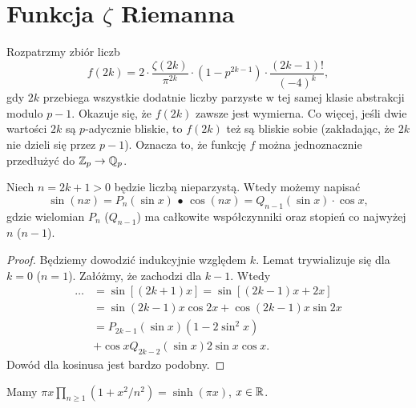 \section{Funkcja $\zeta$ Riemanna}
Rozpatrzmy zbiór liczb
\[
	f(2k) = 2 \cdot \frac{\zeta(2k)}{\pi^{2k}} \cdot (1-p^{2k-1}) \cdot \frac{(2k-1)!}{(-4)^k},
\]
gdy $2k$ przebiega wszystkie dodatnie liczby parzyste w tej samej klasie abstrakcji modulo $p-1$.
Okazuje się, że $f(2k)$  zawsze jest wymierna.
Co więcej, jeśli dwie wartości $2k$ są $p$-adycznie bliskie, to $f(2k)$ też są bliskie sobie (zakładając, że $2k$ nie dzieli się przez $p-1$).
Oznacza to, że funkcję $f$ można jednoznacznie przedłużyć do $\mathbb Z_p \to \mathbb Q_p$.

\begin{lemat}
	Niech $n = 2k+1 > 0$ będzie liczbą nieparzystą.
	Wtedy możemy napisać
	\[
		\sin (nx) = P_n(\sin x) \,\bullet\,
		\cos (nx) = Q_{n-1} (\sin x) \cdot \cos x,
	\]
	gdzie wielomian $P_n$ ($Q_{n-1}$) ma całkowite współczynniki oraz stopień co najwyżej $n$ ($n-1$).
\end{lemat}

\begin{proof}
	Będziemy dowodzić indukcyjnie względem $k$.
	Lemat trywializuje się dla $k = 0$ ($n = 1$).
	Załóżmy, że zachodzi dla $k - 1$.
	Wtedy
	\begin{align*}
	\dots & = \sin [(2k+1)x] = \sin [(2k-1)x + 2x] \\
	& = \sin(2k-1)x \cos 2x + \cos(2k-1)x \sin 2x \\
	& = P_{2k-1}(\sin x) (1-2\sin^2 x) \\
	& + \cos x Q_{2k-2} (\sin x) 2 \sin x \cos x.
	\end{align*}
	Dowód dla kosinusa jest bardzo podobny.
\end{proof}

\begin{fakt}\label{sine}
	Mamy $\pi x \prod_{n \ge 1} (1 + x^2/n^2) = \sinh (\pi x)$, $x \in \mathbb R$.
\end{fakt}

